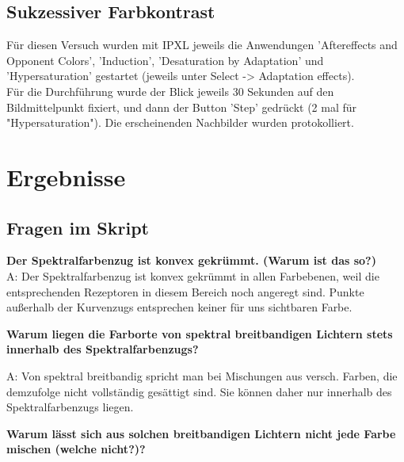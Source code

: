 \documentclass[a4paper]{article}
\begin{document}
\subsection{Sukzessiver Farbkontrast}
Für diesen Versuch wurden mit IPXL jeweils die Anwendungen 'Aftereffects and Opponent Colors', 'Induction', 'Desaturation by Adaptation' und 'Hypersaturation' gestartet (jeweils unter Select -> Adaptation effects).\\
Für die Durchführung wurde der Blick jeweils 30 Sekunden auf den Bildmittelpunkt fixiert, und dann der Button 'Step' gedrückt (2 mal für "Hypersaturation"). Die erscheinenden Nachbilder wurden protokolliert.


\newpage
\section{Ergebnisse}
\subsection{Fragen im Skript}
\vspace{1.5\baselineskip}

\textbf{Der Spektralfarbenzug ist konvex gekrümmt. (Warum ist das so?)} \\

\noindent A: Der Spektralfarbenzug ist konvex gekrümmt in allen Farbebenen, weil die entsprechenden Rezeptoren in diesem Bereich noch angeregt sind. Punkte außerhalb der Kurvenzugs entsprechen keiner für uns sichtbaren Farbe.

\vspace{1.0\baselineskip}

\noindent\textbf{Warum liegen die Farborte von spektral breitbandigen Lichtern stets innerhalb des Spektralfarbenzugs?} 

\vspace{1.0\baselineskip}

\noindent A: Von spektral breitbandig spricht man bei Mischungen aus versch. Farben, die demzufolge nicht vollständig gesättigt sind. Sie können daher nur innerhalb des Spektralfarbenzugs liegen. \\

\vspace{1.0\baselineskip}

\noindent\textbf{Warum lässt sich aus solchen breitbandigen Lichtern nicht jede Farbe mischen (welche nicht?)?} 
\end{document}
